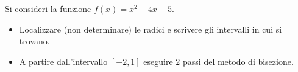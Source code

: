 Si consideri la funzione $f(x)=x^2-4x-5$.
\begin{itemize}
\item  Localizzare (non determinare) le radici
e scrivere gli intervalli in cui si trovano.
\item A partire
dall'intervallo $[-2,1]$ eseguire $2$ passi del metodo di
bisezione.
\end{itemize}
